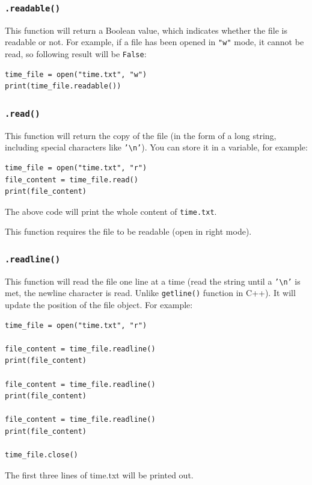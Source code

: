 \documentclass[12pt]{book}
\begin{document}
\subsubsection{\texttt{.readable()}}
\label{sec:org5663f5c}
This function will return a Boolean value, which indicates whether the file is readable or not. For example, if a file has been opened in \texttt{"w"} mode, it cannot be read, so following result will be \texttt{False}:
\begin{verbatim}
time_file = open("time.txt", "w")
print(time_file.readable())
\end{verbatim}
\subsubsection{\texttt{.read()}}
\label{sec:org364f6d7}
This function will return the copy of the file (in the form of a long string, including special characters like \texttt{'\textbackslash{}n'}). You can store it in a variable, for example:
\begin{verbatim}
time_file = open("time.txt", "r")
file_content = time_file.read()
print(file_content)
\end{verbatim}
The above code will print the whole content of \texttt{time.txt}.

This function requires the file to be readable (open in right mode).
\subsubsection{\texttt{.readline()}}
\label{sec:org2ec5f23}
This function will read the file one line at a time (read the string until a \texttt{'\textbackslash{}n'} is met, the newline character is read. Unlike \texttt{getline()} function in C++). It will update the position of the file object. For example:
\begin{verbatim}
time_file = open("time.txt", "r")

file_content = time_file.readline()
print(file_content)

file_content = time_file.readline()
print(file_content)

file_content = time_file.readline()
print(file_content)

time_file.close()
\end{verbatim}
The first three lines of time.txt will be printed out.
\end{document}
